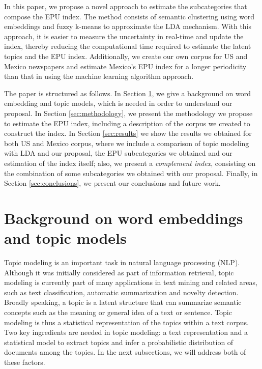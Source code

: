 \documentclass{article}
\begin{document}
 In this paper, we propose a novel approach to estimate the subcategories that compose the EPU index. The method consists of semantic clustering using word embeddings and fuzzy k-means to approximate the LDA mechanism. With this approach, it is easier to measure the uncertainty in real-time and update the index, thereby reducing the computational time required to estimate the latent topics and the EPU index. Additionally, we create our own corpus for US and Mexico newspapers and estimate Mexico's EPU index for a longer periodicity than that in \cite{Baker2016}  using  the \cite{Azqueta2017}  machine learning algorithm approach. 
 
The paper is structured as follows. In Section \ref{sec:background}, we give a background on word embedding and topic models, which is needed in order to understand our proposal. In Section \ref{sec:methodology}, we present the methodology we propose to estimate the EPU index, including a description of the corpus we created to construct the index. In Section \ref{sec:results} we show the results we obtained for both US and Mexico corpus, where we include a comparison of topic modeling with LDA and our proposal, the EPU subcategories we obtained and our estimation of the index itself; also, we present a \emph{complement index}, consisting on the combination of some subcategories we obtained with our proposal. Finally, in Section \ref{sec:conclusions}, we present our conclusions and future work. 


\section{Background on word embeddings and topic models}
\label{sec:background}

Topic modeling is an important task in natural language processing (NLP). Although it was initially considered as part of information retrieval, topic modeling is currently part of many applications in text mining and related areas, such as text classification, automatic summarization and novelty detection.
Broadly speaking, a topic is a latent structure that can summarize semantic concepts such as the meaning or general idea of a text or sentence. 
Topic modeling is thus a statistical representation of the topics within a text corpus. Two key ingredients are needed in topic modeling: a text representation and a statistical model to extract topics and infer a probabilistic distribution of documents among the topics. In the next subsections, we will address both of these factors.
\end{document}
